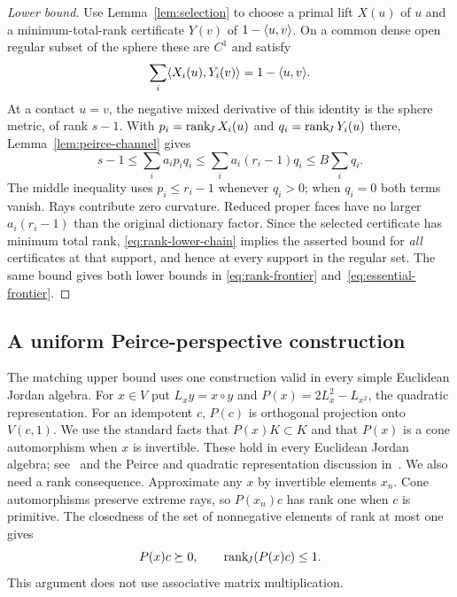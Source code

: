 \begin{proof}[Lower bound]
Use Lemma~\ref{lem:selection} to choose a primal lift $X(u)$ of $u$ and
a minimum-total-rank certificate $Y(v)$ of $1-\langle u,v\rangle$. On a common dense
open regular subset of the sphere these are $C^1$ and satisfy
\[
 \sum_i\langle X_i(u),Y_i(v)\rangle=1-\langle u,v\rangle.
\]
At a contact $u=v$, the negative mixed derivative of this identity is
the sphere metric, of rank $s-1$. With $p_i=\operatorname{rank}_{\!J} X_i(u)$ and
$q_i=\operatorname{rank}_{\!J} Y_i(u)$ there, Lemma~\ref{lem:peirce-channel} gives
\begin{equation}\label{eq:rank-lower-chain}
 s-1\leq\sum_i a_ip_iq_i
 \leq\sum_i a_i(r_i-1)q_i
 \leq B\sum_iq_i.
\end{equation}
The middle inequality uses $p_i\leq r_i-1$ whenever $q_i>0$;
when $q_i=0$ both terms vanish. Rays contribute zero curvature.
Reduced proper faces have no larger $a_i(r_i-1)$ than the original
dictionary factor. Since the selected certificate has minimum total rank,
\eqref{eq:rank-lower-chain} implies the asserted bound for \emph{all}
certificates at that support, and hence at every support in the regular
set. The same bound gives both lower bounds in
\eqref{eq:rank-frontier} and~\eqref{eq:essential-frontier}.
\end{proof}

\subsection{A uniform Peirce-perspective construction}
The matching upper bound uses one construction valid in every simple
Euclidean Jordan algebra. For $x\in V$ put $L_x y=x\circ y$ and
$P(x)=2L_x^2-L_{x^2}$, the quadratic representation.
For an idempotent $c$, $P(c)$ is orthogonal projection onto $V(c,1)$.
We use the standard facts that $P(x)K\subset K$ and that $P(x)$ is a cone
automorphism when $x$ is invertible. These hold in every Euclidean Jordan
algebra; see~\cite[Chapters~II--IV]{FK1994} and the Peirce and quadratic
representation discussion in~\cite[pp.~1554--1555]{GS2010}.
We also need a rank consequence. Approximate any $x$ by invertible elements $x_n$. Cone automorphisms preserve extreme
rays, so $P(x_n)c$ has rank one when $c$ is primitive. The closedness of
the set of nonnegative elements of rank at most one gives
\begin{equation}\label{eq:quadratic-rank}
 P(x)c\succeq0,\qquad \operatorname{rank}_{\!J}(P(x)c)\leq1.
\end{equation}
This argument does not use associative matrix multiplication.

